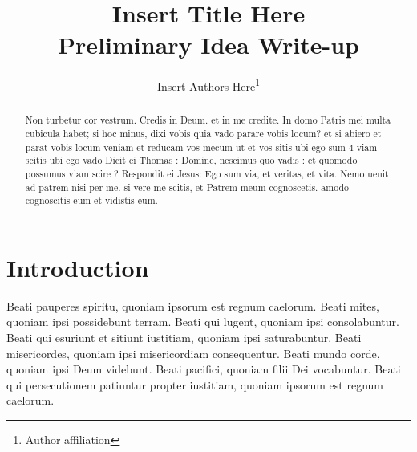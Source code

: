 \documentclass[12pt]{article}
\begin{document}
\title{
Insert Title Here
\\{\color{blue} \large Preliminary Idea Write-up}
}

\author{
Insert Authors Here\footnote{Author affiliation}
}
\begin{titlepage}
% 
\maketitle


\doublespacing
\begin{abstract}
  Non turbetur cor vestrum. Credis in Deum. et in me credite. In domo Patris mei multa cubicula habet; 
  si hoc minus, dixi vobis quia vado parare vobis locum? et si abiero et parat vobis locum veniam et reducam vos
  mecum ut et vos sitis ubi ego sum 4 viam scitis ubi ego vado
  Dicit ei Thomas : Domine, nescimus quo vadis : et quomodo possumus viam scire ?
  Respondit ei Jesus: Ego sum via, et veritas, et vita. Nemo uenit ad patrem nisi per me. 
  si vere me scitis, et Patrem meum cognoscetis. amodo cognoscitis eum et vidistis eum.
\end{abstract}


\end{titlepage}

\doublespacing
\section{Introduction}

Beati pauperes spiritu, quoniam ipsorum est regnum caelorum.
Beati mites, quoniam ipsi possidebunt terram.
Beati qui lugent, quoniam ipsi consolabuntur.
Beati qui esuriunt et sitiunt iustitiam, quoniam ipsi saturabuntur.
Beati misericordes, quoniam ipsi misericordiam consequentur.
Beati mundo corde, quoniam ipsi Deum videbunt.
Beati pacifici, quoniam filii Dei vocabuntur.
Beati qui persecutionem patiuntur propter iustitiam, quoniam ipsorum est regnum caelorum.
\end{document}
